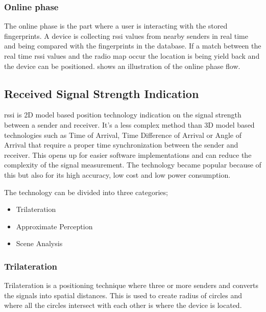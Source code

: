 
\newpage

\subsubsection{Online phase}\label{sec:theoryFingerprintOnline}
The online phase is the part where a user is interacting with the stored fingerprints.
A device is collecting \acrshort{rssi} values from nearby senders in real time and being compared with the fingerprints in the database.
If a match between the real time \acrshort{rssi} values and the radio map occur the location is being yield back and the device can be positioned.\cite{IndoorFingerprintPositioning2017}
 shows an illustration of the online phase flow.




\subsection{Received Signal Strength Indication}\label{sec:theoryRssi}
\acrfull{rssi} is 2D model based position technology indication on the signal strength between a sender and receiver.
It's a less complex method than 3D model based technologies such as Time of Arrival, Time Difference of Arrival or Angle of Arrival that require a proper time synchronization between the sender and receiver.
This opens up for easier software implementations and can reduce the complexity of the signal measurement.
The technology became popular because of this but also for its high accuracy, low cost and low power consumption.
\cite{IndoorFingerprintPositioning2017} 

\bigskip

The technology can be divided into three categories;
\begin{itemize}
\item Trilateration
\item Approximate Perception
\item Scene Analysis \cite{IndoorFingerprintPositioning2017} 
\end{itemize}

\subsubsection{Trilateration}\label{sec:theoryRssiTrilateration}
Trilateration is a positioning technique where three or more senders and converts the signals into spatial distances.
This is used to create radius of circles and where all the circles intersect with each other is where the device is located. \cite{IndoorFingerprintPositioning2017} 


